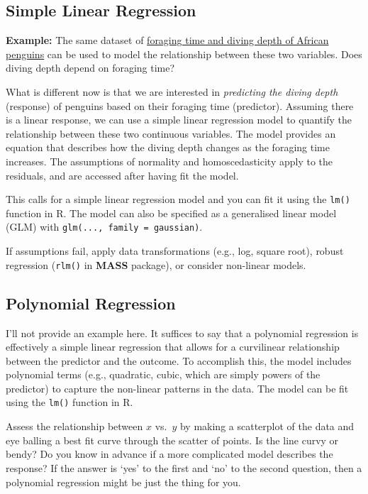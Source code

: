\documentclass[
  letterpaper,
]{book}
\begin{document}
\subsection{Simple Linear Regression}\label{simple-linear-regression}

\textbf{Example:} The same dataset of \hyperref[sec-pearson]{foraging
time and diving depth of African penguins} can be used to model the
relationship between these two variables. Does diving depth depend on
foraging time?

What is different now is that we are interested in \emph{predicting the
diving depth} (response) of penguins based on their foraging time
(predictor). Assuming there is a linear response, we can use a simple
linear regression model to quantify the relationship between these two
continuous variables. The model provides an equation that describes how
the diving depth changes as the foraging time increases. The assumptions
of normality and homoscedasticity apply to the residuals, and are
accessed after having fit the model.

This calls for a simple linear regression model and you can fit it using
the \texttt{lm()} function in R. The model can also be specified as a
generalised linear model (GLM) with
\texttt{glm(...,\ family\ =\ gaussian)}.

If assumptions fail, apply data transformations (e.g., log, square
root), robust regression (\texttt{rlm()} in \textbf{MASS} package), or
consider non-linear models.

\subsection{Polynomial Regression}\label{polynomial-regression}

I'll not provide an example here. It suffices to say that a polynomial
regression is effectively a simple linear regression that allows for a
curvilinear relationship between the predictor and the outcome. To
accomplish this, the model includes polynomial terms (e.g., quadratic,
cubic, which are simply powers of the predictor) to capture the
non-linear patterns in the data. The model can be fit using the
\texttt{lm()} function in R.

Assess the relationship between \(x\) vs.~\(y\) by making a scatterplot
of the data and eye balling a best fit curve through the scatter of
points. Is the line curvy or bendy? Do you know in advance if a more
complicated model describes the response? If the answer is `yes' to the
first and `no' to the second question, then a polynomial regression
might be just the thing for you.
\end{document}

